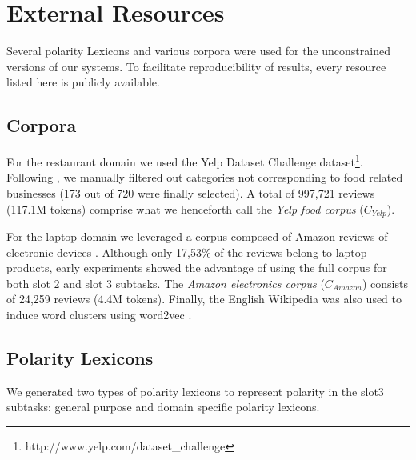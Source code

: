 \documentclass[11pt,letterpaper]{article}
\begin{document}
\section{External Resources}
\label{sec:extRes}

Several polarity Lexicons and various corpora were used for the unconstrained versions of our systems. To facilitate reproducibility of results, every resource listed here is publicly available.

\subsection{Corpora}
\label{sec:ext_corpora}

For the restaurant domain we used the Yelp Dataset Challenge dataset\footnote{http://www.yelp.com/dataset\_challenge}. Following  \cite{nrcSemeval_2014}, we manually filtered out categories not corresponding to food related businesses (173 out of 720 were finally selected). A total of 997,721 reviews (117.1M tokens) comprise what we henceforth call the \textit{Yelp food corpus} ($C_{Yelp}$). 


For the laptop domain we leveraged a corpus composed of Amazon reviews of electronic devices  \cite{Jo_Amazon_2011}. Although only 17,53\% of the reviews belong to laptop products, early experiments showed the advantage of using the full corpus for both slot 2 and slot 3 subtasks. The \textit{Amazon electronics corpus} ($C_{Amazon}$) consists of 24,259 reviews (4.4M tokens). 
Finally, the English Wikipedia was also used to induce word clusters using word2vec \cite{mikolov2013distributed}.

\subsection{Polarity Lexicons}
\label{sec:ext_Lex}

We generated two types of polarity lexicons to represent polarity in the slot3 subtasks: general purpose and domain specific polarity lexicons. 
\end{document}
